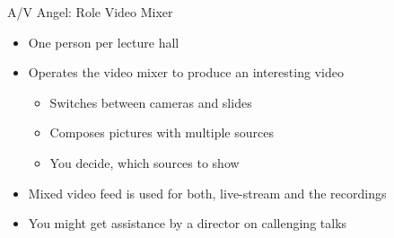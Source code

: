 
\begin{frame}{A/V Angel: Role Video Mixer}
	\begin{itemize}
		\item One person per lecture hall
		\item Operates the video mixer to produce an interesting video
		\begin{itemize}
			\item Switches between cameras and slides
			\item Composes pictures with multiple sources
			\item You decide, which sources to show
		\end{itemize}
		\item Mixed video feed is used for both, live-stream and the recordings 
		\item You might get assistance by a director on callenging talks
	\end{itemize}
\end{frame}
